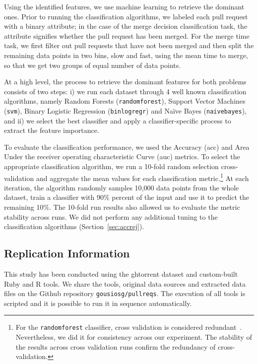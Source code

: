 \documentclass{sig-alternate}
\begin{document}
Using the identified features, we use machine learning to retrieve
the dominant ones. Prior to running the classification algorithms, we labeled
each pull request with a binary attribute; in the case of the \textsf{merge
decision} classification task, the attribute signifies whether the pull request
has been merged. For the \textsf{merge time} task, we first filter out pull
requests that have not been merged and then split the remaining data points in
two bins, slow and fast, using the mean time to merge, so that we get two
groups of equal number of data points.

At a high level, the process to retrieve the dominant features for both
problems consists of two steps: i) we run each dataset through 4 well known
classification algorithms, namely Random Forests (\texttt{randomforest}),
Support Vector Machines (\texttt{svm}), Binary Logistic Regression
(\texttt{binlogregr}) and Na\"ive Bayes (\texttt{naivebayes}), and ii) we select
the best classifier and apply a classifier-specific process to extract the
feature importance. 

To evaluate the classification performance, we used the Accuracy ({\sc acc}) and
Area Under the receiver operating characteristic Curve ({\sc auc}) metrics. To select the
appropriate classification algorithm, we run a 10-fold random selection
cross-validation and aggregate the mean values for each classification
metric.\footnote{For the \texttt{randomforest} classifier, cross validation is
considered redundant~\cite{Breim01}. Nevertheless, we did it for consistency
across our experiment. The stability of the results across cross validation runs
confirm the redundancy of cross-validation.} At each iteration, the algorithm
randomly samples 10,000 data points from the whole dataset, train a
classifier with 90\% percent of the input and use it to predict the remaining
10\%. The 10-fold run results also allowed us to evaluate the metric stability
across runs. We did not perform any additional tuning to the classification
algorithms (Section~\ref{sec:accrej}).

\subsection{Replication Information} 
This study has been conducted using the {\sc ght}orrent
dataset and custom-built Ruby and R tools. We share the tools, original data
sources and extracted data files on the Github repository
\texttt{gousiosg\-/\-pullreqs}. The execution of all tools is scripted and it is
possible to run it in sequence automatically.
\end{document}
